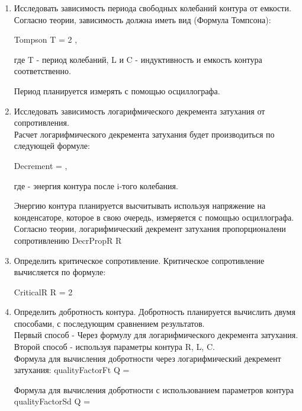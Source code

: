 \begin{enumerate}
    \item Исследовать зависимость периода свободных колебаний контура от емкости. Согласно теории, зависимость должна иметь вид (Формула Томпсона):

    \formula
    {}
    {Tompson}
    {T = 2\pi {} \quad,}

    где T - период колебаний, L и C - индуктивность и емкость контура соответственно.

    Период планируется измерять с помощью осциллографа.

    \item Исследовать зависимость логарифмического декремента затухания от сопротивления. \\ Расчет логарифмического декремента затухания будет производиться по следующей формуле:

    \formula
    {}
    {Decrement}
    {\lambda =  \ln{} \quad,}

    где  - энергия контура после i-того колебания.

    Энергию контура планируется высчитывать используя напряжение на конденсаторе, которое в свою очередь, измеряется с помощью осциллографа. \\

    \formula
    {Согласно теории, логарифмический декремент затухания пропорционалени сопротивлению}
    {DecrPropR}
    {\lambda \propto R}

    \newpage

    \item Определить критическое сопротивление. Критическое сопротивление вычисляется по формуле:

    \formula
    {}
    {CriticalR}
    {R = 2}

    \item Определить добротность контура. Добротность планируется вычислить двумя способами, с последующим сравнением результатов. \\

    Первый способ - Через формулу для логарифмического декремента затухания. \\
    Второй способ - используя параметры контура R, L, C. \\[0.1cm]

    \formula
    {Формула для вычисления добротности через логарифмический декремент затухания:}
    {qualityFactorFt}
    {Q = \frac{\pi}{\lambda}}

    \formula
    {Формула для вычисления добротности с использованием параметров контура}
    {qualityFactorSd}
    {Q =  }

\end{enumerate}

